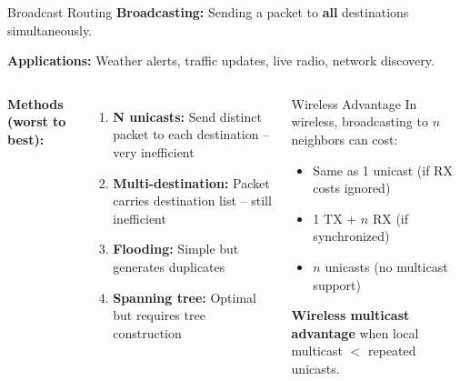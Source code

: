 \documentclass[aspectratio=169,11pt]{beamer}
\begin{document}
\begin{frame}{Broadcast Routing}
    \textbf{Broadcasting:} Sending a packet to \textbf{all} destinations simultaneously.
    
    \vspace{0.3cm}
    \textbf{Applications:} Weather alerts, traffic updates, live radio, network discovery.
    
    \vspace{0.3cm}
    \begin{columns}
        \textbf{Methods (worst to best):}
        \begin{enumerate}
            \item \textbf{N unicasts:} Send distinct packet to each destination -- very inefficient
            \item \textbf{Multi-destination:} Packet carries destination list -- still inefficient
            \item \textbf{Flooding:} Simple but generates duplicates
            \item \textbf{Spanning tree:} Optimal but requires tree construction
        \end{enumerate}
        
        \begin{exampleblock}{Wireless Advantage}
            In wireless, broadcasting to $n$ neighbors can cost:
            \begin{itemize}
                \item Same as 1 unicast (if RX costs ignored)
                \item 1 TX + $n$ RX (if synchronized)
                \item $n$ unicasts (no multicast support)
            \end{itemize}
            
            \textbf{Wireless multicast advantage} when local multicast $<$ repeated unicasts.
        \end{exampleblock}
    \end{columns}
\end{frame}
\end{document}
